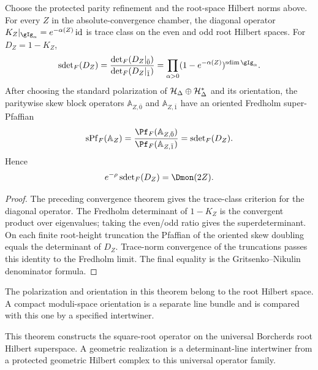 \begin{theorem}
Choose the protected parity refinement and the root-space Hilbert norms above.  For every $Z$ in the absolute-convergence chamber, the diagonal operator $K_Z|_{\gIg_\alpha}=e^{-\alpha(Z)}\id$ is trace class on the even and odd root Hilbert spaces.  For $D_Z=1-K_Z$,
\[
 \sdet_F(D_Z)
 =\frac{\det_F(D_Z|_{\bar0})}{\det_F(D_Z|_{\bar1})}
 =\prod_{\alpha>0}(1-e^{-\alpha(Z)})^{\sdim\gIg_\alpha}.
\]
After choosing the standard polarization of $\mathcal H_\Delta\oplus\mathcal H_\Delta^*$ and its orientation, the paritywise skew block operators $\mathbb A_{Z,\bar0}$ and $\mathbb A_{Z,\bar1}$ have an oriented Fredholm super-Pfaffian
\[
 \operatorname{sPf}_F(\mathbb A_Z)=\frac{\Pf_F(\mathbb A_{Z,\bar0})}{\Pf_F(\mathbb A_{Z,\bar1})}
 =\sdet_F(D_Z).
\]  Hence
\[
 e^{-\rho}\sdet_F(D_Z)=\Dmon(2Z).
\]
\end{theorem}
\begin{proof}
The preceding convergence theorem gives the trace-class criterion for the diagonal operator.  The Fredholm determinant of $1-K_Z$ is the convergent product over eigenvalues; taking the even/odd ratio gives the superdeterminant.  On each finite root-height truncation the Pfaffian of the oriented skew doubling equals the determinant of $D_Z$.  Trace-norm convergence of the truncations passes this identity to the Fredholm limit.  The final equality is the Gritsenko--Nikulin denominator formula.
\end{proof}

\begin{remark}
The polarization and orientation in this theorem belong to the root Hilbert space.  A compact moduli-space orientation is a separate line bundle and is compared with this one by a specified intertwiner.
\end{remark}

This theorem constructs the square-root operator on the universal Borcherds root Hilbert superspace.  A geometric realization is a determinant-line intertwiner from a protected geometric Hilbert complex to this universal operator family.

